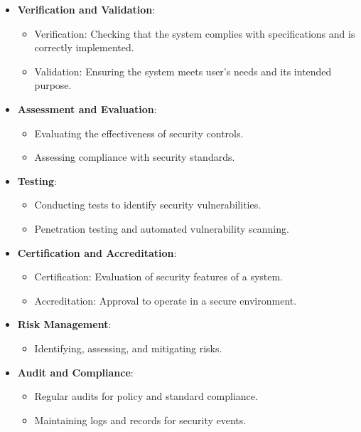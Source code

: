 \begin{itemize}
	\item \textbf{Verification and Validation}:
	\begin{itemize}
		\item Verification: Checking that the system complies with specifications and is correctly implemented.
		\item Validation: Ensuring the system meets user's needs and its intended purpose.
	\end{itemize}
	
	\item \textbf{Assessment and Evaluation}:
	\begin{itemize}
		\item Evaluating the effectiveness of security controls.
		\item Assessing compliance with security standards.
	\end{itemize}
	
	\item \textbf{Testing}:
	\begin{itemize}
		\item Conducting tests to identify security vulnerabilities.
		\item Penetration testing and automated vulnerability scanning.
	\end{itemize}
	
	\item \textbf{Certification and Accreditation}:
	\begin{itemize}
		\item Certification: Evaluation of security features of a system.
		\item Accreditation: Approval to operate in a secure environment.
	\end{itemize}
	
	\item \textbf{Risk Management}:
	\begin{itemize}
		\item Identifying, assessing, and mitigating risks.
	\end{itemize}
	
	\item \textbf{Audit and Compliance}:
	\begin{itemize}
		\item Regular audits for policy and standard compliance.
		\item Maintaining logs and records for security events.
	\end{itemize}
	

\end{itemize}
